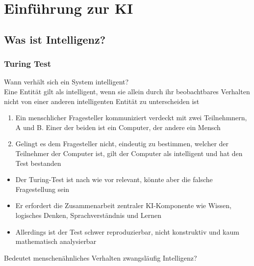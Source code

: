 \section{Einführung zur KI}
\subsection{Was ist Intelligenz?}
\subsubsection*{Turing Test}
 Wann verhält sich ein System intelligent?\\
 Eine Entität gilt als intelligent, wenn sie allein durch ihr beobachtbares Verhalten nicht von einer anderen intelligenten Entität zu unterscheiden ist\\
\begin{enumerate}
    \item Ein menschlicher Fragesteller kommuniziert verdeckt mit zwei Teilnehmnern, A und B. Einer der beiden ist ein Computer, der andere ein Mensch
    \item Gelingt es dem Fragesteller nicht, eindeutig zu bestimmen, welcher der Teilnehmer der Computer ist, gilt der Computer als intelligent und hat den Test bestanden
\end{enumerate}
\begin{itemize}
    \item Der Turing-Test ist nach wie vor relevant, könnte aber die falsche Fragestellung sein
    \item Er erfordert die Zusammenarbeit zentraler KI-Komponente wie Wissen, logisches Denken, Sprachverständnis und Lernen
    \item Allerdings ist der Test schwer reproduzierbar, nicht konstruktiv und kaum mathematisch analysierbar
\end{itemize}
 Bedeutet menschenähnliches Verhalten zwangsläufig Intelligenz?
